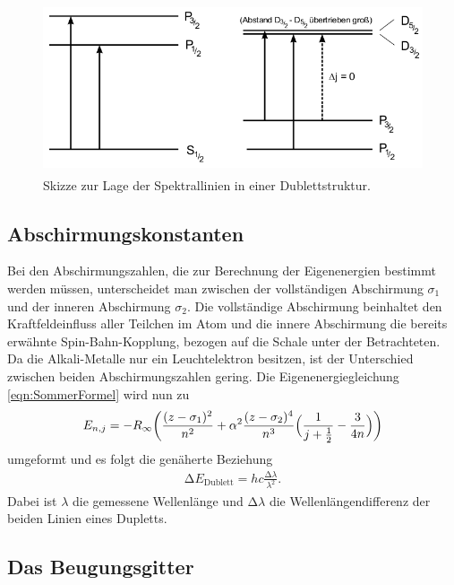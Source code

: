 \begin{figure}
  \centering
  \includegraphics[height=5cm]{MeinFotoalbum:)/Energieuebergaenge.png}
  \caption{Skizze zur Lage der Spektrallinien in einer Dublettstruktur.
  \cite{anleitung}}
  \label{fig:enueber}
\end{figure}

\subsection{Abschirmungskonstanten}

Bei den Abschirmungszahlen, die zur Berechnung der Eigenenergien bestimmt
werden müssen, unterscheidet man zwischen der vollständigen Abschirmung
$\sigma_1$ und der inneren Abschirmung $\sigma_2$. Die vollständige
Abschirmung beinhaltet den Kraftfeldeinfluss aller Teilchen im Atom und die
innere Abschirmung die bereits erwähnte Spin-Bahn-Kopplung, bezogen auf die
Schale unter der Betrachteten. Da die Alkali-Metalle nur ein Leuchtelektron
besitzen, ist der Unterschied zwischen beiden Abschirmungszahlen gering.
Die Eigenenergiegleichung \eqref{eqn:SommerFormel} wird nun zu
\begin{align}
  E_{n,j} = -R_\infty \biggl(\frac{(z-\sigma_1)^2}{n^2} +
  \alpha^2 \frac{(z-\sigma_2)^4}{n^3}
  \Bigl(\frac{1}{j+\frac{1}{2}} - \frac{3}{4n}\Bigr)\biggr)
  \label{eqn:abschirm}
\end{align}
umgeformt und es folgt die genäherte Beziehung
\begin{align}
  \increment E_\text{Dublett} = h c \frac{\increment \lambda}{\lambda^2}.
  \label{eqn:delEd}
\end{align}
Dabei ist $\lambda$ die gemessene Wellenlänge und $\increment \lambda$ die
Wellenlängendifferenz der beiden Linien eines Dupletts.

\subsection{Das Beugungsgitter}

